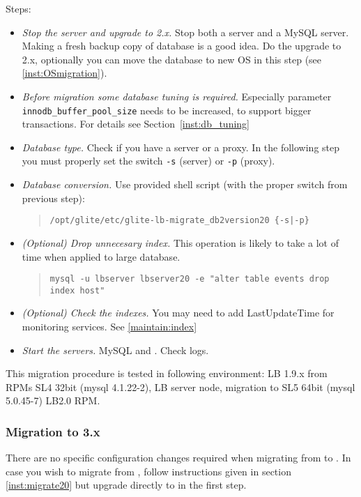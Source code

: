 Steps:
\begin{itemize}
 \item \emph{Stop the server and upgrade to \LB 2.x.} Stop both a \LB
 server and a MySQL server. Making a fresh backup copy of database is
 a good idea. Do the upgrade to \LB 2.x, optionally you can move the
 database to new OS in this step (see \ref{inst:OSmigration}).
 \item \emph{Before migration some database tuning is
 required.} Especially parameter \texttt{innodb\_buffer\_pool\_size}
 needs to be increased, to support bigger transactions. For details
 see Section~\ref{inst:db_tuning}
 \item \emph{Database type.} Check if you have a \LB server or a \LB
 proxy. In the following step you must properly set the switch
 \verb'-s' (server) or \verb'-p' (proxy).
 \item \emph{Database conversion.} Use provided shell script (with the proper
  switch from previous step):
  \begin{quote}
  \verb'/opt/glite/etc/glite-lb-migrate_db2version20 {-s|-p}'
  \end{quote}
 \item \emph{(Optional) Drop unnecesary index.} This operation is
  likely to take a lot of time when applied to large database.
  \begin{quote}
  \verb'mysql -u lbserver lbserver20 -e "alter table events drop index host"'
  \end{quote}
 \item \emph{(Optional) Check the \LB indexes.} You may need to add
 LastUpdateTime for monitoring services. See \ref{maintain:index}
 \item \emph{Start the servers.} MySQL and \LB. Check logs.
\end{itemize}

This migration procedure is tested in following environment: LB 1.9.x
from RPMs SL4 32bit (mysql 4.1.22-2), LB server node, migration to SL5
64bit (mysql 5.0.45-7) LB2.0 RPM. 

\subsubsection{Migration to \LB 3.x}
\label{inst:migrate30}
There are no specific configuration changes required when migrating from  to . In case you wish to migrate from , follow instructions given in section \ref{inst:migrate20} but upgrade directly to  in the first step.


